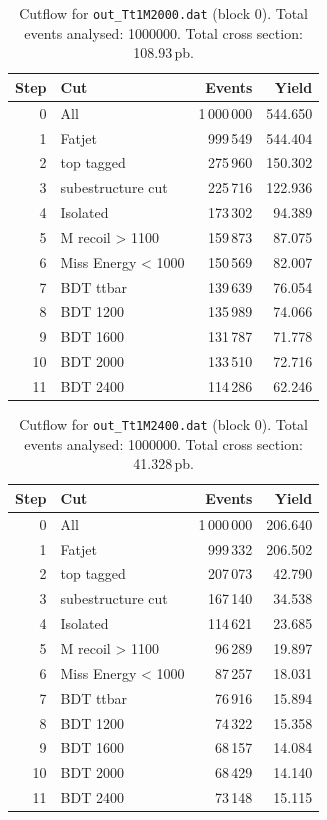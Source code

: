 \documentclass{article}
\begin{document}
\begin{table}[H]
\centering
\begin{tabular}{r l r r}
\toprule
Step & Cut & Events & Yield \\
\midrule
0 & All & 1\,000\,000 & 544.650 \\
1 & Fatjet & 999\,549 & 544.404 \\
2 & top tagged & 275\,960 & 150.302 \\
3 & subestructure cut & 225\,716 & 122.936 \\
4 & Isolated & 173\,302 & 94.389 \\
5 & M recoil > 1100 & 159\,873 & 87.075 \\
6 & Miss Energy < 1000 & 150\,569 & 82.007 \\
7 & BDT ttbar & 139\,639 & 76.054 \\
8 & BDT 1200 & 135\,989 & 74.066 \\
9 & BDT 1600 & 131\,787 & 71.778 \\
10 & BDT 2000 & 133\,510 & 72.716 \\
11 & BDT 2400 & 114\,286 & 62.246 \\
\bottomrule
\end{tabular}
\caption{Cutflow for \texttt{out\_Tt1M2000.dat} (block 0). Total events analysed: 1000000. Total cross section: 108.93\,pb.}
\label{tab:cutflow-out-Tt1M2000-dat}
\end{table}

\begin{table}[H]
\centering
\begin{tabular}{r l r r}
\toprule
Step & Cut & Events & Yield \\
\midrule
0 & All & 1\,000\,000 & 206.640 \\
1 & Fatjet & 999\,332 & 206.502 \\
2 & top tagged & 207\,073 & 42.790 \\
3 & subestructure cut & 167\,140 & 34.538 \\
4 & Isolated & 114\,621 & 23.685 \\
5 & M recoil > 1100 & 96\,289 & 19.897 \\
6 & Miss Energy < 1000 & 87\,257 & 18.031 \\
7 & BDT ttbar & 76\,916 & 15.894 \\
8 & BDT 1200 & 74\,322 & 15.358 \\
9 & BDT 1600 & 68\,157 & 14.084 \\
10 & BDT 2000 & 68\,429 & 14.140 \\
11 & BDT 2400 & 73\,148 & 15.115 \\
\bottomrule
\end{tabular}
\caption{Cutflow for \texttt{out\_Tt1M2400.dat} (block 0). Total events analysed: 1000000. Total cross section: 41.328\,pb.}
\label{tab:cutflow-out-Tt1M2400-dat}
\end{table}
\end{document}
